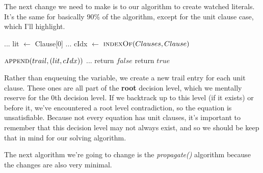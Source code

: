 The next change we need to make is to our algorithm to create watched literals. 
It's the same for basically $90\%$ of the algorithm, except for the unit clause 
case, which I'll highlight.

\begin{algorithm}[H]
\caption{Modified createWatched}\label{alg:21}
\begin{algorithmic}[1]

        \State ...
        \State lit $\gets$ Clause[0]
        \State ...
        \State cIdx $\gets$ $\Call{indexOf}{Clauses, Clause}$

        \State $\Call{append}{trail, (lit, cIdx)}$
        \State ...
    \Else
        \State return $false$
    \EndIf
\EndFor
\State return $true$

\EndProcedure
\end{algorithmic}
\end{algorithm}

Rather than enqueuing the variable, we create a new trail entry for each unit 
clause. These ones are all part of the \textbf{root} decision level, which we 
mentally reserve for the 0th decision level. If we backtrack up to this level (if it exists)
or before it, we've encountered a root level contradiction, so the equation is 
unsatisfiable. Because not every equation has unit clauses, it's important to 
remember that this decision level may not always exist, and so we should be 
keep that in mind for our solving algorithm. 

The next algorithm we're going to change is the \textit{propagate()} algorithm 
because the changes are also very minimal.

